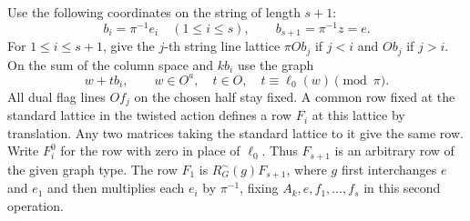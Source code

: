 \documentclass[a4paper,11pt]{article}
\theoremstyle{definition}
\theoremstyle{remark}
\numberwithin{equation}{section}
\begin{document}
Use the following coordinates on the string of length \(s+1\):
\[
          b_i=\pi^{-1}e_i\quad(1\le i\le s),\qquad
          b_{s+1}=\pi^{-1}z=e .
\]
For \(1\le i\le s+1\), give the \(j\)-th string line lattice
\(\pi O b_j\) if \(j<i\) and \(O b_j\) if \(j>i\).
On the sum of the column space and \(kb_i\) use the graph
\[
     w+t b_i,\qquad w\in O^a,\quad t\in O,\quad
                     t\equiv\ell_0(w)\pmod\pi.
\]
All dual flag lines \(Of_j\) on the chosen half stay fixed. A
common row fixed at the standard lattice in the twisted action
defines a row \(F_i\) at this lattice by translation. Any two
matrices taking the standard lattice to it give the same row.
Write \(F_i^0\) for the row with zero in place of \(\ell_0\).
Thus \(F_{s+1}\) is an arbitrary row of the given graph type.
The row \(F_1\) is \(R_G^\sim(g)F_{s+1}\), where \(g\) first interchanges
\(e\) and \(e_1\) and then multiplies each \(e_i\) by \(\pi^{-1}\),
fixing \(A_k,e,f_1,\ldots,f_s\) in this second operation.
\end{document}
